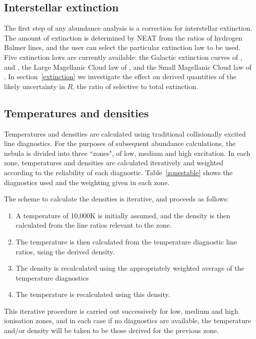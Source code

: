 \documentclass[useAMS,usenatbib]{mn2e}
\begin{document}
\subsection{Interstellar extinction}

The first step of any abundance analysis is a correction for interstellar extinction.  The amount of extinction is determined by NEAT from the ratios of hydrogen Balmer lines, and the user can select the particular extinction law to be used.  Five extinction laws are currently available: the Galactic extinction curves of \citet{1983MNRAS.203..301H}, \citet{1990ApJS...72..163F} and \citet{1989ApJ...345..245C}, the Large Magellanic Cloud law of \citet{1983MNRAS.203..301H}, and the Small Magellanic Cloud law of \citet{1984A&A...132..389P}.  In section~\ref{extinction} we investigate the effect on derived quantities of the likely uncertainty in $R$, the ratio of selective to total extinction.

\subsection{Temperatures and densities}

Temperatures and densities are calculated using traditional collisionally excited line diagnostics.  For the purposes of subsequent abundance calculations, the nebula is divided into three ``zones", of low, medium and high excitation.  In each zone, temperatures and densities are calculated iteratively and weighted according to the reliability of each diagnostic.  Table~\ref{zonestable} shows the diagnostics used and the weighting given in each zone.

The scheme to calculate the densities is iterative, and proceeds as follows:

\begin{enumerate}
\item A temperature of 10,000K is initially assumed, and the density is then calculated from the line ratios relevant to the zone.
\item The temperature is then calculated from the temperature diagnostic line ratios, using the derived density.
\item The density is recalculated using the appropriately weighted average of the temperature diagnostics
\item The temperature is recalculated using this density.
\end{enumerate}

This iterative procedure is carried out successively for low, medium and high ionisation zones, and in each case if no diagnostics are available, the temperature and/or density will be taken to be those derived for the previous zone.
\end{document}
